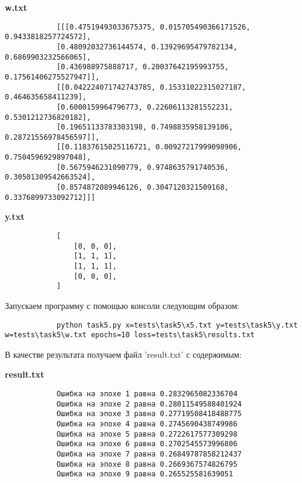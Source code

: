 \documentclass[bachelor, och, report]{../shiza}
\begin{document}
        \textbf{w.txt}
        \begin{verbatim}
            [[[0.47519493033675375, 0.015705490366171526, 0.9433818257724572],
            [0.48092032736144574, 0.13929695479782134, 0.6869903232566065],
            [0.436988975888717, 0.20037642195993755, 0.17561406275527947]],
            [[0.042224071742743785, 0.15331022315027187, 0.464635658411239],
            [0.6000159964796773, 0.22606113281552231, 0.5301212736820182],
            [0.19651133783303198, 0.7498835958139106, 0.28721556978456597]],
            [[0.11837615025116721, 0.00927217999098906, 0.7504596929897048],
            [0.5675946231090779, 0.9748635791740536, 0.30501309542663524],
            [0.8574872089946126, 0.3047120321509168, 0.3376899733092712]]]
        \end{verbatim}

        \textbf{y.txt}
        \begin{verbatim}
            [
                [0, 0, 0],
                [1, 1, 1],
                [1, 1, 1],
                [0, 0, 0],
            ]
        \end{verbatim}

        Запускаем программу с помощью консоли следующим образом:

        \begin{verbatim}
            python task5.py x=tests\task5\x5.txt y=tests\task5\y.txt w=tests\task5\w.txt epochs=10 loss=tests\task5\results.txt
        \end{verbatim}

        В качестве результата получаем файл 'result.txt' с содержимым:

        \textbf{result.txt}
        \begin{verbatim}
            Ошибка на эпохе 1 равна 0.2832965082336704
            Ошибка на эпохе 2 равна 0.28011549588401924
            Ошибка на эпохе 3 равна 0.27719508418488775
            Ошибка на эпохе 4 равна 0.2745690438749986
            Ошибка на эпохе 5 равна 0.2722617577309298
            Ошибка на эпохе 6 равна 0.2702545573996806
            Ошибка на эпохе 7 равна 0.26849787858212437
            Ошибка на эпохе 8 равна 0.2669367574826795
            Ошибка на эпохе 9 равна 0.265525581639051            
        \end{verbatim}

\end{document}
